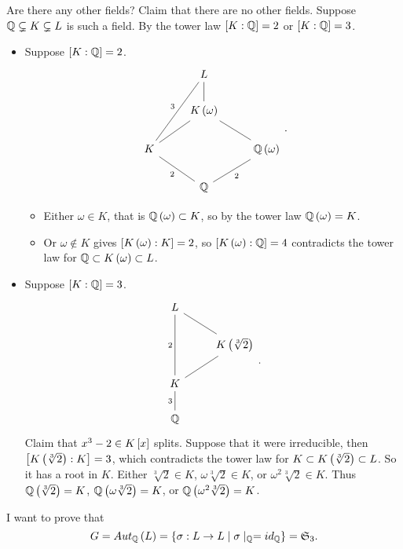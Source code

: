 Are there any other fields? Claim that there are no other fields. Suppose $ \Q \subsetneq K \subsetneq L $ is such a field. By the tower law $ \sb{K : \Q} = 2 $ or $ \sb{K : \Q} = 3 $.
\begin{itemize}
\item Suppose $ \sb{K : \Q} = 2 $.
$$
\begin{tikzcd}
& L & \\
& K\rb{\omega} \arrow[dash]{u} & \\
K \arrow[dash]{uur}{3} \arrow[dash]{ur} & & \Q\rb{\omega} \arrow[dash]{ul} \\
& \Q \arrow[dash]{ul}{2} \arrow[dash, swap]{ur}{2} &
\end{tikzcd}.
$$
\begin{itemize}
\item Either $ \omega \in K $, that is $ \Q\rb{\omega} \subset K $, so by the tower law $ \Q\rb{\omega} = K $.
\item Or $ \omega \notin K $ gives $ \sb{K\rb{\omega} : K} = 2 $, so $ \sb{K\rb{\omega} : \Q} = 4 $ contradicts the tower law for $ \Q \subset K\rb{\omega} \subset L $.
\end{itemize}
\item Suppose $ \sb{K : \Q} = 3 $.
$$
\begin{tikzcd}
L & \\
& K\rb{\sqrt[3]{2}} \arrow[dash]{ul} \\
K \arrow[dash]{uu}{2} \arrow[dash]{ur} & \\
\Q \arrow[dash]{u}{3} &
\end{tikzcd}.
$$
Claim that $ x^3 - 2 \in K\sb{x} $ splits. Suppose that it were irreducible, then $ \sb{K\rb{\sqrt[3]{2}} : K} = 3 $, which contradicts the tower law for $ K \subset K\rb{\sqrt[3]{2}} \subset L $. So it has a root in $ K $. Either $ \sqrt[3]{2} \in K $, $ \omega\sqrt[3]{2} \in K $, or $ \omega^2\sqrt[3]{2} \in K $. Thus $ \Q\rb{\sqrt[3]{2}} = K $, $ \Q\rb{\omega\sqrt[3]{2}} = K $, or $ \Q\rb{\omega^2\sqrt[3]{2}} = K $.
\end{itemize}
I want to prove that
$$ G = Aut_\Q\rb{L} = \cb{\sigma : L \to L \mid \sigma \mid_\Q = id_\Q} = \mathfrak{S}_3. $$


